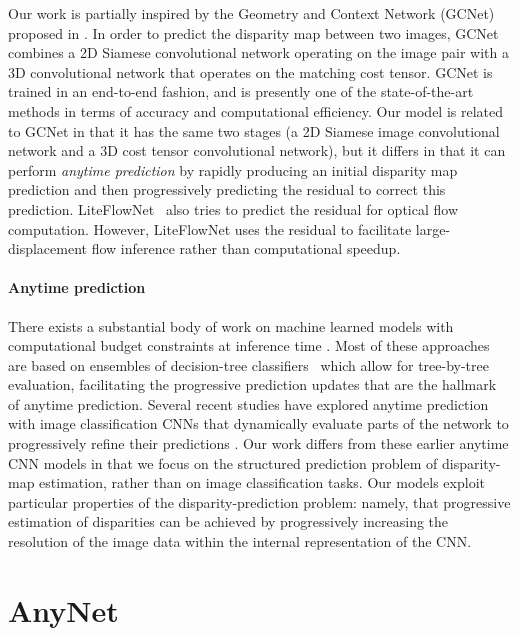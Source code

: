 \documentclass[letterpaper, 10 pt, conference]{ieeeconf}
\newcommand{\nameshort}[1]{AnyNet}
\begin{document}
Our work is partially inspired by the Geometry and Context Network (GCNet) proposed in \cite{kendall2017end}. In order to predict the disparity map between two images, GCNet combines a 2D Siamese convolutional network operating on the image pair with a 3D convolutional network that operates on the matching cost tensor. GCNet is trained in an end-to-end fashion, and is presently one of the state-of-the-art methods in terms of accuracy and computational efficiency. Our model is related to GCNet in that it has the same two stages (a 2D Siamese image convolutional network and a 3D cost tensor convolutional network), but it differs in that it can perform \emph{anytime prediction} by rapidly producing an initial disparity map prediction and then progressively predicting the residual to correct this prediction. LiteFlowNet~\cite{hui18liteflownet} also tries to predict the residual for optical flow computation. However, LiteFlowNet uses the residual to facilitate large-displacement flow inference rather than computational speedup.

\paragraph{\textbf{Anytime prediction}} There exists a substantial body of work on machine learned models with computational budget constraints at inference time \cite{viola2001robust,grubb2012speedboost,karayev2014anytime,greedymiser,xu2013cost,wang2015acyclic,huang2017multi}. Most of these approaches are based on ensembles of decision-tree classifiers~\cite{viola2001robust,greedymiser,grubb2012speedboost,xu2013cost} which allow for tree-by-tree evaluation, facilitating the progressive prediction updates that are the hallmark of anytime prediction. Several recent studies have explored anytime prediction with image classification CNNs that dynamically evaluate parts of the network to progressively refine their predictions \cite{fractalnet,huang2017multi,veit2017,wu2017blockdrop,mcgill2017,figurnov2017}. Our work differs from these earlier anytime CNN models in that we focus on the structured prediction problem of disparity-map estimation, rather than on image classification tasks. Our models exploit particular properties of the disparity-prediction problem: namely, that progressive estimation of disparities can be achieved by progressively increasing the resolution of the image data within the internal representation of the CNN.
 	
	
	

\section{\nameshort{}}
\end{document}
